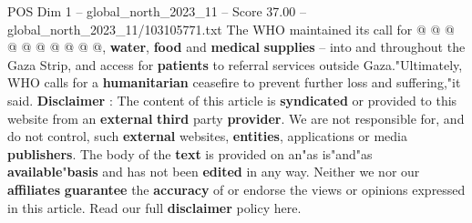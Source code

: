 \begin{textsample}{POS Dim 1 – global\_north\_2023\_11 – Score 37.00 – global\_north\_2023\_11/103105771.txt}
The WHO maintained its call for @ @ @ @ @ @ @ @ @ @, \textbf{water}, \textbf{food} and \textbf{medical} \textbf{supplies} -- into and throughout the Gaza Strip, and access for \textbf{patients} to referral services outside Gaza."Ultimately, WHO calls for a \textbf{humanitarian} ceasefire to prevent further loss and suffering,"it said. \textbf{Disclaimer} : The content of this article is \textbf{syndicated} or provided to this website from an \textbf{external} \textbf{third} party \textbf{provider}.
We are not responsible for, and do not control, such \textbf{external} websites, \textbf{entities}, applications or media \textbf{publishers}.
The body of the \textbf{text} is provided on an"as is"and"as \textbf{available}"\textbf{basis} and has not been \textbf{edited} in any way.
Neither we nor our \textbf{affiliates} \textbf{guarantee} the \textbf{accuracy} of or endorse the views or opinions expressed in this article.
Read our full \textbf{disclaimer} policy here.

\end{textsample}
